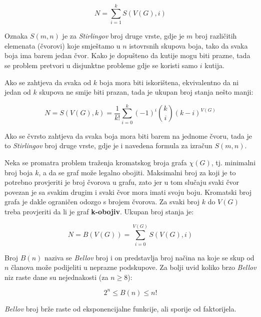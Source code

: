 \documentclass[times, utf8, diplomski, numeric]{fer}
\begin{document}
\begin{equation}
N = \sum_{i=1}^{k} S(V(G), i)
\end{equation}

Oznaka $S(m,n)$ je za \emph{Stirlingov} broj druge vrste, gdje je $m$ broj različitih elemenata (čvorovi) koje smještamo u $n$ istovrsnih skupova boja, tako da svaka boja ima barem jedan čvor. Kako je dopušteno da kutije mogu biti prazne, tada se problem pretvori u disjunktne probleme gdje se koristi samo $i$ kutija. 

Ako se zahtjeva da svaka od $k$ boja mora biti iskorištena, ekvivalentno da ni jedan od $k$ skupova ne smije biti prazan, tada je ukupan broj stanja nešto manji:

\begin{equation}
N = S(V(G), k) = \frac{1}{k!}\sum_{i=0}^{k} (-1)^i \binom{k}{i}(k-i)^{V(G)}  
\end{equation}

Ako se čvrsto zahtjeva da svaka boja mora biti barem na jednome čvoru, tada je to \emph{Stirlingov} broj druge vrste, gdje je i navedena formula za izračun $S(m,n)$.

Neka se promatra problem traženja kromatskog broja grafa $\chi(G)$, tj. minimalni broj boja $k$, a da se graf može legalno obojiti. Maksimalni broj za koji je to potrebno provjeriti je broj čvorova u grafu, zato jer u tom slučaju svaki čvor povezan je sa svakim drugim i svaki čvor mora imati svoju boju. Kromatski broj grafa je dakle ograničen odozgo s brojem čvorova. Za svaki broj $k$ do $V(G)$ treba provjeriti da li je graf \textbf{k-obojiv}. Ukupan broj stanja je:

\begin{equation}
N = B(V(G)) = \sum_{i=0}^{V(G)} S(V(G), i)
\end{equation}

Broj $B(n)$ naziva se \emph{Bellov} broj i on predstavlja broj načina na koje se skup od $n$ članova može podijeliti u neprazne podskupove. Za bolji uvid koliko brzo \emph{Bellov} niz raste dane su nejednakosti (za $n\ge 8$): 

\begin{equation}
2^n \le B(n) \le n! 
\end{equation}

\emph{Bellov} broj brže raste od eksponencijalne funkcije, ali sporije od faktorijela.
\end{document}
